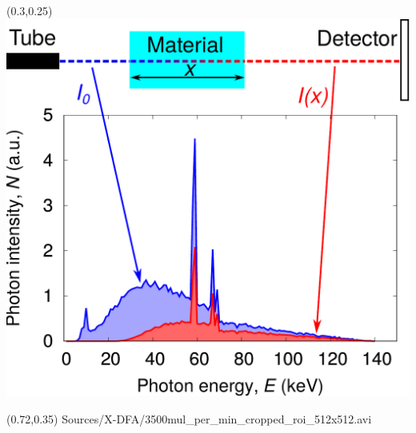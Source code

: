 \begin{frame}
\begin{textblock}{0.4}(0.3,0.25)
	\centering
	\includegraphics[width=\textwidth]
	{Sources/beam_hardening/x-ray_spectra_beam_hardening.pdf}
\end{textblock}
	
\begin{textblock}{0.25}(0.72,0.35)
	\centering
	\centering
	{Sources/X-DFA/3500mul_per_min_cropped_roi_512x512.avi}
\end{textblock}

\end{frame}


